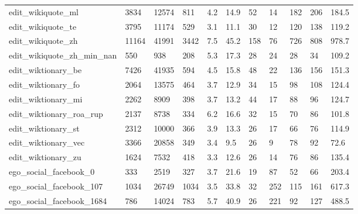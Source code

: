 \begin{longtable}{lllllllllll}
 edit\_wikiquote\_ml                                  & 3834       & 12574     & 811   & 4.2    & 14.9   & 52    & 14     & 182    & 206    & 184.5   \\
 edit\_wikiquote\_te                                  & 3795       & 11174     & 529   & 3.1    & 11.1   & 30    & 12     & 120    & 138    & 119.2   \\
 edit\_wikiquote\_zh                                  & 11164      & 41991     & 3442  & 7.5    & 45.2   & 158   & 76     & 726    & 808    & 978.7   \\
 edit\_wikiquote\_zh\_min\_nan                          & 550        & 938       & 208   & 5.3    & 17.3   & 28    & 24     & 28     & 34     & 109.2   \\
 edit\_wiktionary\_be                                 & 7426       & 41935     & 594   & 4.5    & 15.8   & 48    & 22     & 136    & 156    & 151.3   \\
 edit\_wiktionary\_fo                                 & 2064       & 13575     & 464   & 3.7    & 12.9   & 34    & 15     & 98     & 108    & 124.4   \\
 edit\_wiktionary\_mi                                 & 2262       & 8909      & 398   & 3.7    & 13.2   & 44    & 17     & 88     & 96     & 124.7   \\
 edit\_wiktionary\_roa\_rup                            & 2137       & 8738      & 334   & 6.2    & 16.6   & 32    & 15     & 70     & 86     & 101.8   \\
 edit\_wiktionary\_st                                 & 2312       & 10000     & 366   & 3.9    & 13.3   & 26    & 17     & 66     & 76     & 114.9   \\
 edit\_wiktionary\_vec                                & 3366       & 20858     & 349   & 3.4    & 9.5    & 26    & 9      & 78     & 92     & 72.6    \\
 edit\_wiktionary\_zu                                 & 1624       & 7532      & 418   & 3.3    & 12.6   & 26    & 14     & 76     & 86     & 135.4   \\
 ego\_social\_facebook\_0                              & 333        & 2519      & 327   & 3.7    & 21.6   & 19    & 87     & 52     & 66     & 203.4   \\
 ego\_social\_facebook\_107                            & 1034       & 26749     & 1034  & 3.5    & 33.8   & 32    & 252    & 115    & 161    & 617.3   \\
 ego\_social\_facebook\_1684                           & 786        & 14024     & 783   & 5.7    & 40.9   & 26    & 221    & 92     & 127    & 488.5   \\

\end{longtable}
